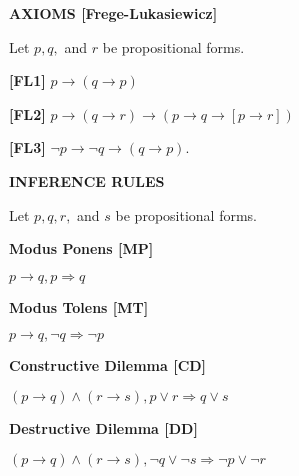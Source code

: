 \documentclass[12pt, a4paper]{article}
\begin{document}
\justifying

\begin{flushleft}

\blacksquare \textbf{ AXIOMS [Frege-Lukasiewicz]}

\vspace{4mm}

\hspace{4mm} Let $p,q,$ and $r$ be propositional forms.

\begin{description}

    \item \bullet \textbf{ [FL1] } $p \to(q\to p)$
    \item \bullet \textbf{ [FL2] } $p \to(q\to r)\to(p\to q\to[p\to r])$
    \item \bullet \textbf{ [FL3] } $\neg p\to\neg q\to(q\to p)$.

\end{description}

\vspace{8mm}

\blacksquare \textbf{ INFERENCE RULES }

\vspace{4mm}

\hspace{4mm} Let $p,q,r,$ and $s$ be propositional forms.

\begin{description}

    \item \bullet \textbf{ Modus Ponens [MP]}\par
    \hspace{15mm}$p\to q, p\Rightarrow q$\par
    
    \item \bullet \textbf{ Modus Tolens [MT]}\par
    \hspace{15mm}$p\to q, \neg q\Rightarrow\neg p$\par
    
    \item \bullet \textbf{ Constructive Dilemma [CD]}\par\hspace{15mm}
    $(p\to q)\wedge(r\to s), p\vee r\Rightarrow q\vee s$\par
    
    \item \bullet \textbf{ Destructive Dilemma [DD]}\par\hspace{15mm}
    $(p\to q)\wedge(r\to s),\neg q\vee\neg s\Rightarrow \neg p\vee\neg r$
    

\end{description}
\end{flushleft}
\end{document}
